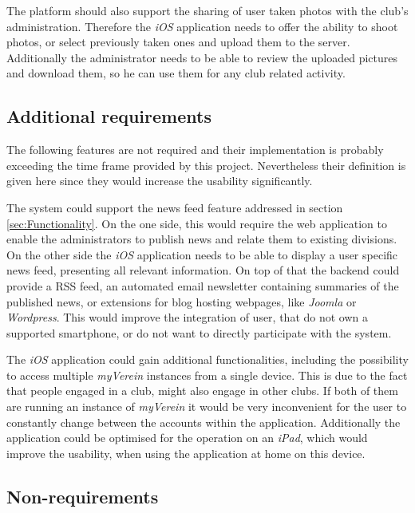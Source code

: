 The platform should also support the sharing of user taken photos with the club's administration. Therefore the \emph{iOS} application needs to offer the ability to shoot photos, or select previously taken ones and upload them to the server. Additionally the administrator needs to be able to review the uploaded pictures and download them, so he can use them for any club related activity.

\subsection{Additional requirements}
\label{sec:AdditionalReq}

The following features are not required and their implementation is probably exceeding the time frame provided by this project. Nevertheless their definition is given here since they would increase the usability significantly. 

The system could support the news feed feature addressed in section \vref{sec:Functionality}. On the one side, this would require the web application to enable the administrators to publish news and relate them to existing divisions. On the other side the \emph{iOS} application needs to be able to display a user specific news feed, presenting all relevant information. On top of that the backend could provide a \gls{RSS} feed, an automated email newsletter containing summaries of the published news, or extensions for blog hosting webpages, like \emph{Joomla} or \emph{Wordpress}. This would improve the integration of user, that do not own a supported smartphone, or do not want to directly participate with the system.

The \emph{iOS} application could gain additional functionalities, including the possibility to access multiple \emph{myVerein} instances from a single device. This is due to the fact that people engaged in a club, might also engage in other clubs. If both of them are running an instance of \emph{myVerein} it would be very inconvenient for the user to constantly change between the accounts within the application. Additionally the application could be optimised for the operation on an \emph{iPad}, which would improve the usability, when using the application at home on this device.

\subsection{Non-requirements} %


